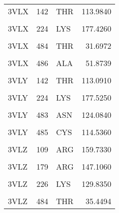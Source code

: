 \begin{table}
\begin{tabular}{lrlr}
			3VLX & 142 & THR & 113.9840\\
			\cellcolor{gray!6}{3VLX} & \cellcolor{gray!6}{179} & \cellcolor{gray!6}{ARG} & \cellcolor{gray!6}{148.5140}\\
			\addlinespace
			3VLX & 224 & LYS & 177.4260\\
			\cellcolor{gray!6}{3VLX} & \cellcolor{gray!6}{483} & \cellcolor{gray!6}{ASN} & \cellcolor{gray!6}{124.5220}\\
			3VLX & 484 & THR & 31.6972\\
			\cellcolor{gray!6}{3VLX} & \cellcolor{gray!6}{485} & \cellcolor{gray!6}{CYS} & \cellcolor{gray!6}{112.7580}\\
			3VLX & 486 & ALA & 51.8739\\
			\addlinespace
			\cellcolor{gray!6}{3VLY} & \cellcolor{gray!6}{109} & \cellcolor{gray!6}{ARG} & \cellcolor{gray!6}{156.2520}\\
			3VLY & 142 & THR & 113.0910\\
			\cellcolor{gray!6}{3VLY} & \cellcolor{gray!6}{179} & \cellcolor{gray!6}{ARG} & \cellcolor{gray!6}{149.9780}\\
			3VLY & 224 & LYS & 177.5250\\
			\cellcolor{gray!6}{3VLY} & \cellcolor{gray!6}{226} & \cellcolor{gray!6}{LYS} & \cellcolor{gray!6}{132.6280}\\
			\addlinespace
			3VLY & 483 & ASN & 124.0840\\
			\cellcolor{gray!6}{3VLY} & \cellcolor{gray!6}{484} & \cellcolor{gray!6}{THR} & \cellcolor{gray!6}{32.6034}\\
			3VLY & 485 & CYS & 114.5360\\
			\cellcolor{gray!6}{3VLY} & \cellcolor{gray!6}{486} & \cellcolor{gray!6}{ALA} & \cellcolor{gray!6}{51.7331}\\
			3VLZ & 109 & ARG & 159.7330\\
			\addlinespace
			\cellcolor{gray!6}{3VLZ} & \cellcolor{gray!6}{142} & \cellcolor{gray!6}{THR} & \cellcolor{gray!6}{112.9370}\\
			3VLZ & 179 & ARG & 147.1060\\
			\cellcolor{gray!6}{3VLZ} & \cellcolor{gray!6}{224} & \cellcolor{gray!6}{LYS} & \cellcolor{gray!6}{175.4720}\\
			3VLZ & 226 & LYS & 129.8350\\
			\cellcolor{gray!6}{3VLZ} & \cellcolor{gray!6}{483} & \cellcolor{gray!6}{ASN} & \cellcolor{gray!6}{122.9020}\\
			\addlinespace
			3VLZ & 484 & THR & 35.4494\\

\end{tabular}
\end{table}
